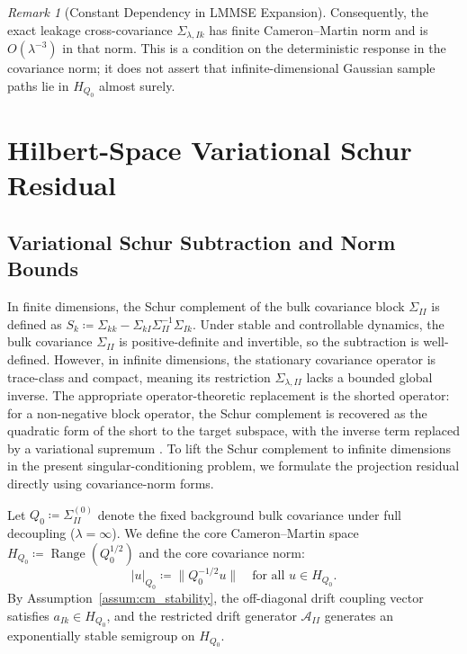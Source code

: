 \documentclass[11pt]{amsart}
\theoremstyle{plain}
\theoremstyle{definition}
\theoremstyle{remark}
\newtheorem{remark}[theorem]{Remark}
\begin{document}
\begin{remark}[Constant Dependency in LMMSE Expansion]
  Consequently, the exact leakage cross-covariance
  $\Sigma_{\lambda,Ik}$ has finite Cameron--Martin norm and is
  $O(\lambda^{-3})$ in that norm.  This is a condition on the deterministic
  response in the covariance norm; it does not assert that infinite-dimensional
  Gaussian sample paths lie in $H_{Q_0}$ almost surely.
\end{remark}

\section{Hilbert-Space Variational Schur Residual}
\label{sec:infdim}

\subsection{Variational Schur Subtraction and Norm Bounds}
\label{sec:infdim:variational}

In finite dimensions, the Schur complement of the bulk covariance block $\Sigma_{II}$ is defined as $S_k \coloneqq \Sigma_{kk} - \Sigma_{kI} \Sigma_{II}^{-1} \Sigma_{Ik}$. Under stable and controllable dynamics, the bulk covariance $\Sigma_{II}$ is positive-definite and invertible, so the subtraction is well-defined. However, in infinite dimensions, the stationary covariance operator is trace-class and compact, meaning its restriction $\Sigma_{\lambda,II}$ lacks a bounded global inverse. The appropriate operator-theoretic replacement is the shorted operator: for a non-negative block operator, the Schur complement is recovered as the quadratic form of the short to the target subspace, with the inverse term replaced by a variational supremum \cite{krein1947selfadjoint,anderson1975shorted}. To lift the Schur complement to infinite dimensions in the present singular-conditioning problem, we formulate the projection residual directly using covariance-norm forms.

Let $Q_0 \coloneqq \Sigma_{II}^{(0)}$ denote the fixed background bulk covariance under full decoupling ($\lambda = \infty$). We define the core Cameron--Martin space $H_{Q_0} \coloneqq \operatorname{Range}(Q_0^{1/2})$ and the core covariance norm:
\begin{equation}
  |u|_{Q_0} \coloneqq \|Q_0^{-1/2} u\| \quad \text{for all } u \in H_{Q_0}.
\end{equation}
By Assumption~\ref{assum:cm_stability}, the off-diagonal drift coupling vector satisfies $a_{Ik} \in H_{Q_0}$, and the restricted drift generator $\mathcal{A}_{II}$ generates an exponentially stable semigroup on $H_{Q_0}$.
\end{document}
